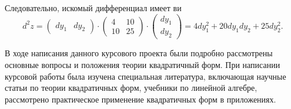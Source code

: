 \documentclass[bachelor, och, coursework, times]{SCWorks}
\newcommand\tab[1][1cm]{\hspace*{#1}}
\newcommand{\tl}{\newline\tab}
\begin{document}
Следовательно, искомый дифференциал имеет ви
$$d^2z=
\begin{pmatrix}
dy_1&dy_2
\end{pmatrix}\!\cdot\! 
\begin{pmatrix}
4&10\\
10&25 
\end{pmatrix}\!\cdot\! 
\begin{pmatrix}dy_1\\dy_2\end{pmatrix}= 4dy_1^2+20dy_1dy_2+25dy_2^2.$$

\conclusion
В ходе написания данного курсового проекта были подробно рассмотрены основные вопросы и положения теории квадратичный форм.
\tl
При написании курсовой работы была изучена специальная литература, включающая научные статьи по теории квадратичных форм, учебники по линейной алгебре, рассмотрено практическое применение квадратичных форм в приложениях.
\end{document}
